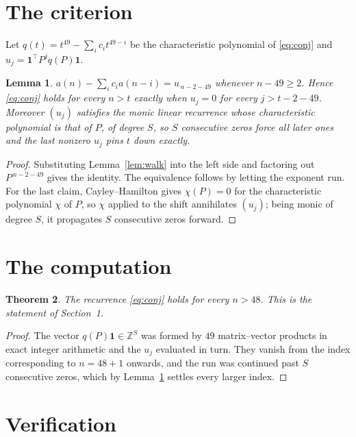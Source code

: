 \documentclass[11pt,a4paper]{article}
\theoremstyle{plain}
\newtheorem{theorem}{Theorem}
\newtheorem{lemma}[theorem]{Lemma}
\theoremstyle{definition}
\begin{document}
\section{The criterion}

Let $q(t)=t^{49}-\sum_i c_i t^{49-i}$ be the characteristic polynomial of
\eqref{eq:conj} and $u_j=\mathbf{1}^{\!\top}P^{j}q(P)\mathbf{1}$.

\begin{lemma}\label{lem:crit}
$a(n)-\sum_i c_i a(n-i)=u_{\,n-2-49}$ whenever $n-49\ge2$. Hence
\eqref{eq:conj} holds for every $n>t$ exactly when $u_j=0$ for every
$j>t-2-49$. Moreover $(u_j)$ satisfies the monic linear recurrence whose
characteristic polynomial is that of $P$, of degree $S$, so $S$ consecutive zeros force all
later ones and the last nonzero $u_j$ pins $t$ down exactly.
\end{lemma}

\begin{proof}
Substituting Lemma~\ref{lem:walk} into the left side and factoring out
$P^{\,n-2-49}$ gives the identity. The equivalence follows by letting the exponent
run. For the last claim, Cayley--Hamilton gives $\chi(P)=0$ for the characteristic
polynomial $\chi$ of $P$, so $\chi$ applied to the shift annihilates $(u_j)$; being monic of
degree $S$, it propagates $S$ consecutive zeros forward.
\end{proof}

\section{The computation}

\begin{theorem}
The recurrence \eqref{eq:conj} holds for every $n>48$. This is the statement of
Section~1.
\end{theorem}

\begin{proof}
The vector $q(P)\mathbf{1}\in\mathbb{Z}^{S}$ was formed by $49$ matrix--vector
products in exact integer arithmetic and the $u_j$ evaluated in turn. They vanish from the
index corresponding to $n=48+1$ onwards, and the run was continued past $S$ consecutive
zeros, which by Lemma~\ref{lem:crit} settles every larger index.
\end{proof}

\section{Verification}
\end{document}
